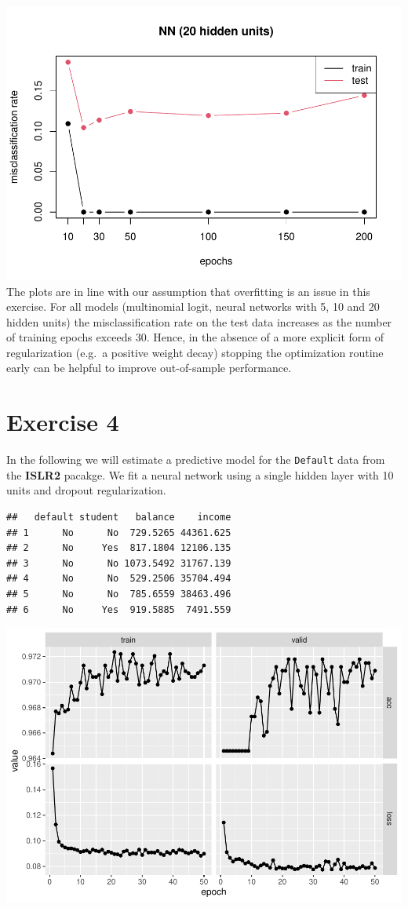\documentclass[
]{article}
\begin{document}
\includegraphics{A4_files/figure-latex/unnamed-chunk-10-4.pdf} The plots
are in line with our assumption that overfitting is an issue in this
exercise. For all models (multinomial logit, neural networks with 5, 10
and 20 hidden units) the misclassification rate on the test data
increases as the number of training epochs exceeds 30. Hence, in the
absence of a more explicit form of regularization (e.g.~a positive
weight decay) stopping the optimization routine early can be helpful to
improve out-of-sample performance.

\newpage

\section{Exercise 4}\label{exercise-4}

In the following we will estimate a predictive model for the
\texttt{Default} data from the \textbf{ISLR2} pacakge. We fit a neural
network using a single hidden layer with 10 units and dropout
regularization.

\begin{verbatim}
##   default student   balance    income
## 1      No      No  729.5265 44361.625
## 2      No     Yes  817.1804 12106.135
## 3      No      No 1073.5492 31767.139
## 4      No      No  529.2506 35704.494
## 5      No      No  785.6559 38463.496
## 6      No     Yes  919.5885  7491.559
\end{verbatim}

\includegraphics{A4_files/figure-latex/unnamed-chunk-11-1.pdf}
\end{document}
